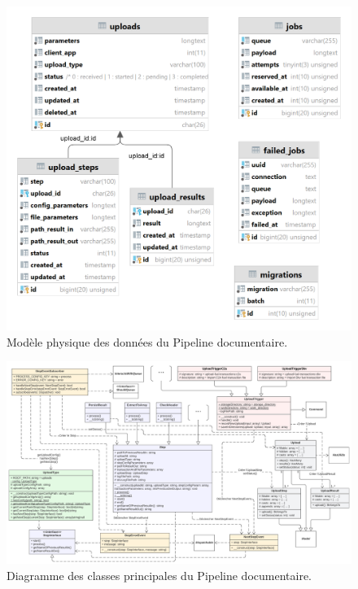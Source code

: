 \begin{figure}
    \centering
    \includegraphics[width=\textwidth]{img/sdf_db}
    \caption{Modèle physique des données du Pipeline documentaire.}
    \label{fig:pmd}
\end{figure}

\begin{figure}
    \centering
    \includegraphics[width=\textwidth]{img/class-diagram-2}
    \caption{Diagramme des classes principales du Pipeline documentaire.}
    \label{fig:class-diagram}
\end{figure}